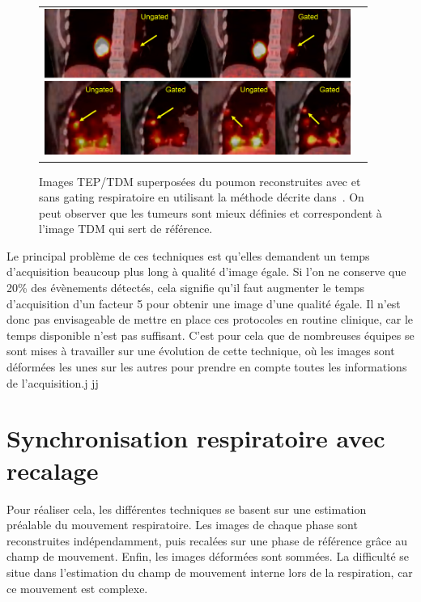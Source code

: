 \begin{figure}[h!]
	\begin{center}
		\begin{tabular}{c c}
			\includegraphics[width=10cm]{images/chang2010}
		\end{tabular}
	\end{center}
	\caption{Images TEP/TDM superposées du poumon reconstruites avec et sans gating respiratoire en utilisant la méthode décrite dans~\cite{GuopingChang2010Implementation}. On peut observer que les tumeurs sont mieux définies et correspondent à l'image TDM qui sert de référence.} 
	\label{fig:chang2010}
\end{figure}

Le principal problème de ces techniques est qu'elles demandent un temps d'acquisition beaucoup plus long à qualité d'image égale. Si l'on ne conserve que 20\% des évènements détectés, cela signifie qu'il faut augmenter le temps d'acquisition d'un facteur 5 pour obtenir une image d'une qualité égale. Il n'est donc pas envisageable de mettre en place ces protocoles en routine clinique, car le temps disponible n'est pas suffisant. C'est pour cela que de nombreuses équipes se sont mises à travailler sur une évolution de cette technique, où les images sont déformées les unes sur les autres pour prendre en compte toutes les informations de l'acquisition.j jj

\section{Synchronisation respiratoire avec recalage}
\label{lab:corrPostRecon}

Pour réaliser cela, les différentes techniques se basent sur une estimation préalable du mouvement respiratoire. Les images de chaque phase sont reconstruites indépendamment, puis recalées sur une phase de référence grâce au champ de mouvement. Enfin, les images déformées sont sommées. La difficulté se situe dans l'estimation du champ de mouvement interne lors de la respiration, car ce mouvement est complexe.

